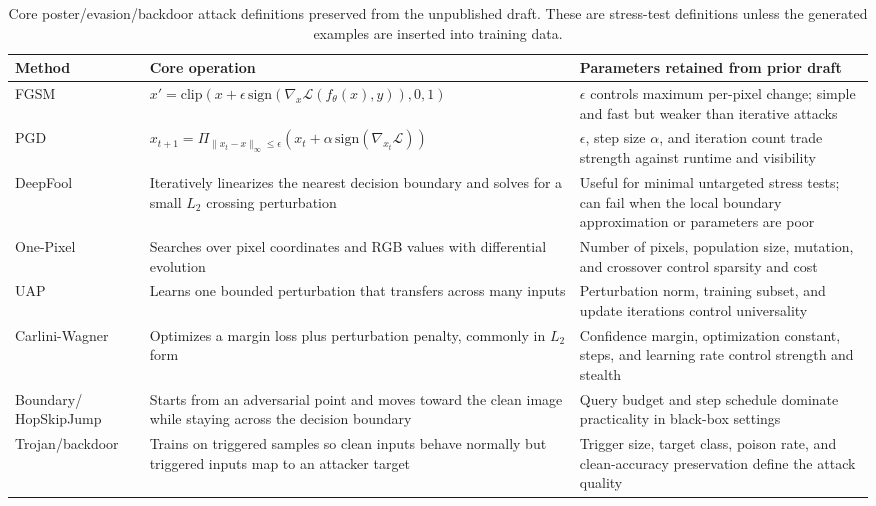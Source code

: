 \documentclass[conference]{IEEEtran}
\begin{document}
\begin{table}[t]
\centering
\caption{Core poster/evasion/backdoor attack definitions preserved from the unpublished draft. These are stress-test definitions unless the generated examples are inserted into training data.}
\label{tab:legacyattackdefs}
\small
\begin{tabular}{p{}p{}p{}}
\toprule
Method & Core operation & Parameters retained from prior draft \\
\midrule
FGSM & \(x'=\mathrm{clip}(x+\epsilon\,\mathrm{sign}(\nabla_x\mathcal{L}(f_\theta(x),y)),0,1)\) & \(\epsilon\) controls maximum per-pixel change; simple and fast but weaker than iterative attacks \\
PGD & \(x_{t+1}=\Pi_{\|x_t-x\|_\infty\le\epsilon}(x_t+\alpha\,\mathrm{sign}(\nabla_{x_t}\mathcal{L}))\) & \(\epsilon\), step size \(\alpha\), and iteration count trade strength against runtime and visibility \\
DeepFool & Iteratively linearizes the nearest decision boundary and solves for a small \(L_2\) crossing perturbation & Useful for minimal untargeted stress tests; can fail when the local boundary approximation or parameters are poor \\
One-Pixel & Searches over pixel coordinates and RGB values with differential evolution & Number of pixels, population size, mutation, and crossover control sparsity and cost \\
UAP & Learns one bounded perturbation that transfers across many inputs & Perturbation norm, training subset, and update iterations control universality \\
Carlini-Wagner & Optimizes a margin loss plus perturbation penalty, commonly in \(L_2\) form & Confidence margin, optimization constant, steps, and learning rate control strength and stealth \\
Boundary/ HopSkipJump & Starts from an adversarial point and moves toward the clean image while staying across the decision boundary & Query budget and step schedule dominate practicality in black-box settings \\
Trojan/backdoor & Trains on triggered samples so clean inputs behave normally but triggered inputs map to an attacker target & Trigger size, target class, poison rate, and clean-accuracy preservation define the attack quality \\
\bottomrule
\end{tabular}
\end{table}
\end{document}
